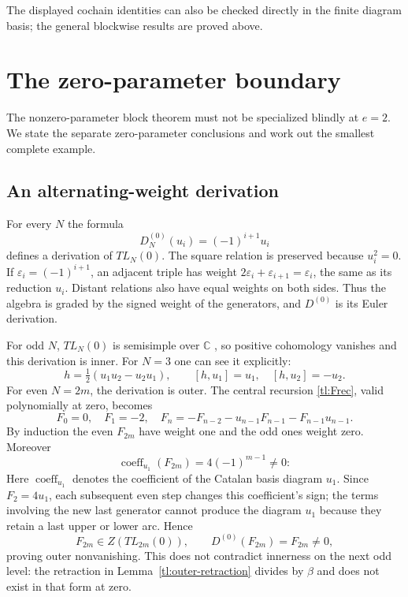 \documentclass[a4paper,11pt,oneside,reqno]{amsart}
\theoremstyle{definition}
\numberwithin{equation}{section}
\begin{document}
The displayed cochain identities can also be checked directly in the
finite diagram basis; the general blockwise results are proved above.

\section{The zero-parameter boundary}\label{tl:zero}
	The nonzero-parameter block theorem must not be specialized blindly
	at $e=2$.  We state the separate zero-parameter conclusions and work out the
	smallest complete example.
	
	\subsection{An alternating-weight derivation}
	For every $N$ the formula
	\begin{equation}\label{tl:Dzero}
		D_N^{(0)}(u_i)=(-1)^{i+1}u_i
	\end{equation}
	defines a derivation of $TL_N(0)$.  The square relation is preserved
	because $u_i^2=0$.  If $\varepsilon_i=(-1)^{i+1}$, an adjacent
	triple has weight $2\varepsilon_i+\varepsilon_{i+1}=\varepsilon_i$,
	the same as its reduction $u_i$.  Distant relations also have equal
	weights on both sides.  Thus the algebra is graded by the signed
	weight of the generators, and $D^{(0)}$ is its Euler derivation.
	
	For odd $N$, $TL_N(0)$ is semisimple over $\mathbb C$
	\cite[Proposition~8.2]{RSA}, so positive cohomology vanishes and
	this derivation is inner.  For $N=3$ one can see it explicitly:
	\[
	h=\tfrac12(u_1u_2-u_2u_1),\qquad
	[h,u_1]=u_1,\quad [h,u_2]=-u_2.
	\]
	For even $N=2m$, the derivation is outer.  The central recursion
	\eqref{tl:Frec}, valid polynomially at zero, becomes
	\[
	F_0=0,\quad F_1=-2,\quad
	F_n=-F_{n-2}-u_{n-1}F_{n-1}-F_{n-1}u_{n-1}.
	\]
	By induction the even $F_{2m}$ have weight one and the odd ones
	weight zero.  Moreover
	\[
	\operatorname{coeff}_{u_1}(F_{2m})=4(-1)^{m-1}\ne0:
	\]
	Here $\operatorname{coeff}_{u_1}$ denotes the coefficient of the
	Catalan basis diagram $u_1$. Since $F_2=4u_1$, each subsequent even
	step changes this coefficient's
	sign; the terms involving the new last generator cannot produce the
	diagram $u_1$ because they retain a last upper or lower arc.
	Hence
	\[
	F_{2m}\in Z(TL_{2m}(0)),\qquad
	D^{(0)}(F_{2m})=F_{2m}\ne0,
	\]
	proving outer nonvanishing.  This does not contradict innerness on
	the next odd level: the retraction in
	Lemma~\ref{tl:outer-retraction} divides by $\beta$ and does not
	exist in that form at zero.
	
\end{document}
